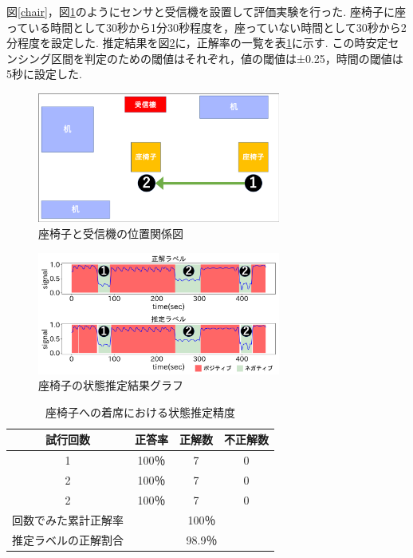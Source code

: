 \documentclass[Japanese]{dicomopapers}
\begin{document}
図\ref{chair}，図\ref{zaisu_position}のようにセンサと受信機を設置して評価実験を行った.
座椅子に座っている時間として30秒から1分30秒程度を，座っていない時間として30秒から2分程度を設定した.
推定結果を図\ref{chair_graph}に，正解率の一覧を表\ref{chair_fig}に示す.
この時安定センシング区間を判定のための閾値はそれぞれ，値の閾値は±0.25，時間の閾値は5秒に設定した.


\begin{figure}[tbh]
    \centering
    \includegraphics[width=8cm]{zaisu_position.png}
    \caption{座椅子と受信機の位置関係図}
    \label{zaisu_position}
\end{figure}


\begin{figure}[tbh]
    \centering
    \includegraphics[width=8cm]{zaisu_graph.png}
    \caption{座椅子の状態推定結果グラフ}
    \label{chair_graph}
\end{figure}


\begin{table}[tbh]
    \begin{center}
        \caption{座椅子への着席における状態推定精度}
        \label{chair_fig}
        \begin{tabular}{|c|c|c|c|} \hline
        試行回数 & 正答率 & 正解数 & 不正解数 \\ \hline
        1 & 100％ & 7 & 0 \\ \hline
        2 & 100％ & 7 & 0 \\ \hline
        2 & 100％ & 7 & 0 \\ \hline \hline
        回数でみた累計正解率 & \multicolumn{3}{c|}{100％} \\ \hline \hline
        推定ラベルの正解割合 & \multicolumn{3}{c|}{98.9％} \\ \hline

        \end{tabular}
    \end{center}
\end{table}
\end{document}
